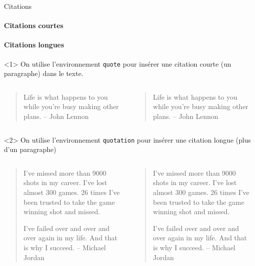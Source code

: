 \begin{frame}[fragile,c]{Citations}
	\framesubtitle<1>{Citations courtes}
	\framesubtitle<2>{Citations longues}
	\begin{onlyenv}
		On utilise l'environnement \texttt{quote} pour insérer une citation courte (un paragraphe)
		dans le texte.
	
		\begin{columns}
			\begin{column}{.49\textwidth}
				\vspace{-17mm}
\begin{codesource}
	\begin{quote}
		Life is what happens to you while 
		you're busy making other plans. 
		-- John Lennon
	\end{quote}
\end{codesource}
			\end{column}
		
			\begin{column}{.49\textwidth}
				\begin{quote}
					Life is what happens to you while you're busy making other plans. -- John Lennon
				\end{quote}
			\end{column}
		\end{columns}
	\end{onlyenv}

	\begin{onlyenv}
		On utilise l'environnement \texttt{quotation} pour insérer une citation longue (plus
		d'un paragraphe)
		
		\begin{columns}
			\begin{column}{.49\textwidth}
				\vspace{-38mm}
\begin{codesource}
	\begin{quotation}
		I've missed more than 9000 shots in my 
		career. I've lost almost 300 games. 26 
		times I've been trusted to take the game 
		winning shot and missed.
		
		I've failed over and over and over again 
		in my life. And that is why I succeed. 
		-- Michael Jordan
	\end{quotation}
\end{codesource}	
			\end{column}
		
			\begin{column}{.49\textwidth}
\begin{quotation}
	I've missed more than 9000 shots in my career. 
	I've lost almost 300 games. 26 times I've been 
	trusted to take the game winning shot and missed.
	
	I've failed over and over and over again in my life. 
	And that is why I succeed. -- Michael Jordan
\end{quotation}
			\end{column}
		\end{columns}
	\end{onlyenv}
\end{frame}